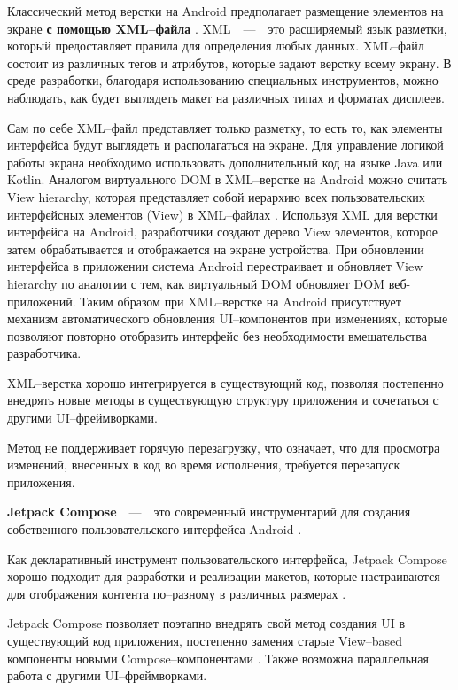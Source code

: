 Классический метод верстки на Android предполагает размещение элементов на экране \textbf{с помощью XML--файла} \cite{xml-android}.
XML~~---~~это расширяемый язык разметки, который предоставляет правила для определения любых данных.
XML--файл состоит из различных тегов и атрибутов, которые задают верстку всему экрану. 
В среде разработки, благодаря использованию специальных инструментов, можно наблюдать, как будет выглядеть макет на различных типах и форматах дисплеев.

Сам по себе XML--файл представляет только разметку, то есть то, как элементы интерфейса будут выглядеть и располагаться на экране. 
Для управление логикой работы экрана необходимо использовать дополнительный код на языке Java или Kotlin.
Аналогом виртуального DOM в XML--верстке на Android можно считать View hierarchy, которая представляет собой иерархию всех пользовательских интерфейсных элементов (View) в XML--файлах \cite{dom-android}. 
Используя XML для верстки интерфейса на Android, разработчики создают дерево View элементов, которое затем обрабатывается и отображается на экране устройства. 
При обновлении интерфейса в приложении система Android перестраивает и обновляет View hierarchy по аналогии с тем, как виртуальный DOM обновляет DOM веб-приложений. 
Таким образом при XML--верстке на Android присутствует механизм автоматического обновления UI--компонентов при изменениях, которые позволяют повторно отобразить интерфейс без необходимости вмешательства разработчика.

XML--верстка хорошо интегрируется в существующий код, позволяя постепенно внедрять новые методы в существующую структуру приложения и сочетаться с другими UI--фреймворками.

Метод не поддерживает горячую перезагрузку, что означает, что для просмотра изменений, внесенных в код во время исполнения, требуется перезапуск приложения.

\textbf{Jetpack Compose}~~---~~это современный инструментарий для создания собственного пользовательского интерфейса Android \cite{jetpack}.

Как декларативный инструмент пользовательского интерфейса, Jetpack Compose хорошо подходит для разработки и реализации макетов, которые настраиваются для отображения контента по--разному в различных размерах \cite{jetpack-layout}.

Jetpack Compose позволяет поэтапно внедрять свой метод создания UI в существующий код приложения, постепенно заменяя старые View--based компоненты новыми Compose--компонентами \cite{jetpack-layout}. 
Также возможна параллельная работа с другими UI--фреймворками.

